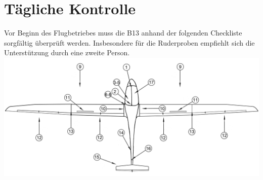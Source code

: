 \section{Tägliche Kontrolle}
Vor Beginn des Flugbetriebes muss die B13 anhand der folgenden Checkliste sorgfältig überprüft werden. Insbesondere für die Ruderproben empfiehlt sich die Unterstützung durch eine zweite Person.\\
\includegraphics[width=\textwidth]{b13check.png}
